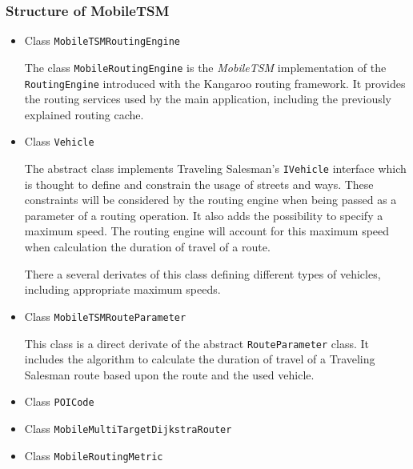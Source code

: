 \subsubsection{Structure of MobileTSM}
\label{subsubsec:routing_mobiletsm_structure}

\begin{itemize}
		
	\item Class \texttt{MobileTSMRoutingEngine}
	
		The class \texttt{MobileRoutingEngine} is the \emph{MobileTSM} implementation of the \texttt{RoutingEngine} introduced with the Kangaroo routing framework. It provides the routing services used by the main application, including the previously explained routing cache.
		
	\item Class \texttt{Vehicle}
	
		The abstract class  implements Traveling Salesman's \texttt{IVehicle} interface which is thought to define and constrain the usage of streets and ways. These constraints will be considered by the routing engine when being passed as a parameter of a routing operation. It also adds the possibility to specify a maximum speed. The routing engine will account for this maximum speed when calculation the duration of travel of a route.\newline
		
		There a several derivates of this class defining different types of vehicles, including appropriate maximum speeds.
	
	\item Class \texttt{MobileTSMRouteParameter}
	
		This class is a direct derivate of the abstract \texttt{RouteParameter} class. It includes the algorithm to calculate the duration of travel of a Traveling Salesman route based upon the route and the used vehicle.

	\item Class \texttt{POICode}

	\item Class \texttt{MobileMultiTargetDijkstraRouter}
	
	\item Class \texttt{MobileRoutingMetric}

\end{itemize}



